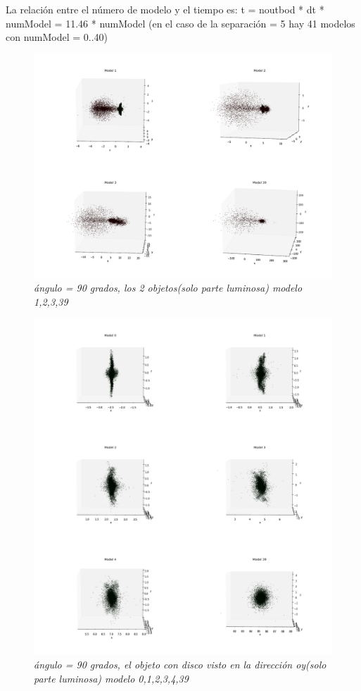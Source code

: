 \documentclass[12pt]{article} %
\renewcommand{\=}[1]{\stackrel{#1}{=}} %
\theoremstyle{definition}
\theoremstyle{remark}
\begin{document}
\normalsize
La relación entre el número de modelo y el tiempo es: t = noutbod * dt * numModel = 11.46 *  numModel
(en el caso de la separación = 5 hay 41 modelos con numModel = 0..40)



\begin{figure}[!ht]
 \centering
 \includegraphics[scale=0.2]{90deg_m_sep5.png}
 \caption{\emph{ ángulo = 90 grados, los 2 objetos(solo parte luminosa) modelo 1,2,3,39 }}
\end{figure}

\begin{figure}[!ht]
 \centering
 \includegraphics[scale=0.2]{90deg-m-c2y.png}
 \caption{\emph{ ángulo = 90 grados, el objeto con disco visto en la dirección oy(solo parte luminosa) modelo 0,1,2,3,4,39 }}
\end{figure}
\end{document}
